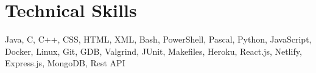 \documentclass[a4,10pt]{article}
\newenvironment{zitemize}{
\begin{itemize}\itemsep0pt \parskip0pt \parsep1pt}
{\end{itemize}\vspace{-0.5cm}}
\begin{document}



\section{Technical Skills}
{Java, C, C++, CSS, HTML, XML, Bash, PowerShell, Pascal, Python, JavaScript, Docker, Linux, Git, GDB, Valgrind, JUnit, Makefiles, Heroku, React.js, Netlify, Express.js, MongoDB, Rest API}
\vspace{-0.2cm}







\end{document}
